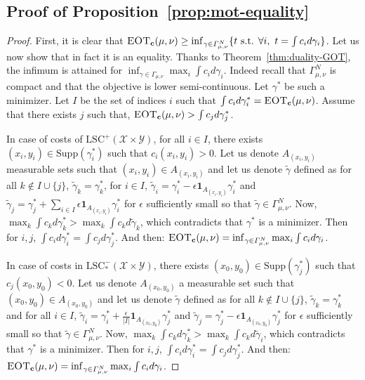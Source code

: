 \subsection{Proof of Proposition~\ref{prop:mot-equality}}
\label{prv:mot-equality}
\begin{proof}

First, it is clear that $\textsc{EOT}_{\mathbf{c}}(\mu,\nu) \geq  \inf_{\gamma\in\Gamma^N_{\mu,\nu}}\{t\text{ s.t. }\forall i,~t=\int c_id\gamma_i\}$. Let us now show that in fact it is an equality. Thanks to Theorem~\ref{thm:duality-GOT}, the infimum is attained for $\inf_{\gamma\in\Gamma_{\mu,\nu}}\max_i\int c_id\gamma_i$. Indeed recall that $\Gamma^N_{\mu,\nu}$ is compact and that the objective is lower semi-continuous. Let $\gamma^*$ be such a minimizer. Let $I$ be the set of indices $i$ such that $\int c_id\gamma^*_i=\textsc{EOT}_{\mathbf{c}}(\mu,\nu)$. Assume that there exists $j$ such that, $\textsc{EOT}_{\mathbf{c}}(\mu,\nu)>\int c_jd\gamma^*_j$. 

In case of costs of $\mathrm{LSC}^+(\mathcal{X}\times\mathcal{Y})$, for all $i\in I$, there exists $(x_i,y_i)\in \text{Supp}(\gamma^*_i)$ such that $c_i(x_i,y_i)>0$. Let us denote $A_{(x_i,y_i)}$ measurable sets such that $(x_i,y_i)\in A_{(x_i,y_i)}$ and let us denote $\tilde{\gamma}$ defined as for all $k\notin I\cup\{j\}$, $\tilde{\gamma}_k = \gamma_k^*$, for $i\in I$, $\tilde{\gamma}_i = \gamma^*_i-\epsilon \mathbf{1}_{A_{(x_i,y_i)}}\gamma^*_i$ and $\tilde{\gamma}_j = \gamma^*_j+\sum_{i\in I}\epsilon \mathbf{1}_{A_{(x_i,y_i)}}\gamma^*_i$ for $\epsilon$ sufficiently small so that $\tilde{\gamma}\in\Gamma^N_{\mu,\nu}$. Now, $\max_k \int c_k d\gamma^*_k>\max_k \int c_k d\tilde{\gamma}_k$, which contradicts that $\gamma^*$ is a minimizer. Then for $i,j$, $\int c_id\gamma^*_i=\int c_jd\gamma^*_j$. And then:
$\textsc{EOT}_{\mathbf{c}}(\mu,\nu) = \inf_{\gamma\in\Gamma^N_{\mu,\nu}}\max_i\int c_id\gamma_i$.


In case of costs in $\mathrm{LSC}^-_{*}(\mathcal{X}\times\mathcal{Y})$, there exists $(x_0,y_0)\in \text{Supp}(\gamma^*_j)$ such that $c_j(x_0,y_0)<0$. Let us denote $A_{(x_0,y_0)}$ a measurable set such that $(x_0,y_0)\in A_{(x_0,y_0)}$ and let us denote $\tilde{\gamma}$ defined as for all $k\notin I\cup\{j\}$, $\tilde{\gamma}_k = \gamma_k^*$ and for all $i\in I$, $\tilde{\gamma}_i = \gamma^*_i+\frac{\epsilon}{\lvert I\rvert} \mathbf{1}_{A_{(x_0,y_0)}}\gamma^*_j$ and $\tilde{\gamma}_j = \gamma^*_j-\epsilon\mathbf{1}_{A_{(x_0,y_0)}}\gamma^*_j$ for $\epsilon$ sufficiently small so that $\tilde{\gamma}\in\Gamma^N_{\mu,\nu}$. Now, $\max_k \int c_k d\gamma^*_k>\max_k \int c_k d\tilde{\gamma}_i$, which contradicts that $\gamma^*$ is a minimizer. Then for $i,j$, $\int c_id\gamma^*_i=\int c_jd\gamma^*_j$. And then:
$\textsc{EOT}_{\mathbf{c}}(\mu,\nu) = \inf_{\gamma\in\Gamma^N_{\mu,\nu}}\max_i\int c_id\gamma_i$.


\end{proof}
